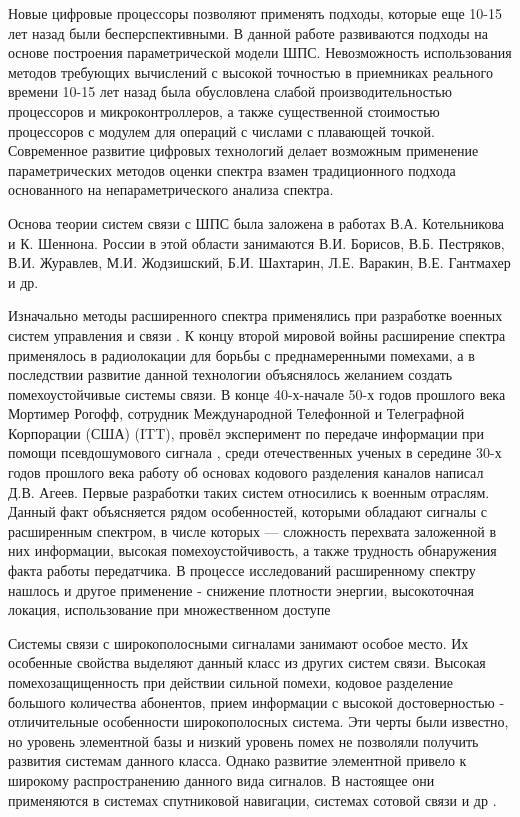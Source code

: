 Новые цифровые процессоры позволяют применять подходы, которые еще 10-15 лет назад были бесперспективными.
В данной работе развиваются подходы на основе построения параметрической модели ШПС. Невозможность использования
методов требующих вычислений с высокой точностью в приемниках реального времени
10-15 лет назад была обусловлена слабой производительностью процессоров и микроконтроллеров, а также существенной
стоимостью процессоров с модулем для операций с числами с плавающей точкой. Современное развитие цифровых технологий делает 
возможным применение параметрических методов оценки спектра взамен традиционного подхода основанного на непараметрического
анализа спектра.

Основа теории систем связи с ШПС была заложена в работах В.А. Котельникова и К. Шеннона.
России в этой области занимаются В.И. Борисов, В.Б. Пестряков, В.И. Журавлев, М.И. Жодзишский, Б.И. Шахтарин, Л.Е.  Варакин, В.Е. Гантмахер и др.

Изначально методы расширенного спектра применялись при разработке военных систем управления и связи \cite{sklyar}.
К концу второй мировой войны расширение спектра применялось в радиолокации для борьбы с преднамеренными помехами, а
в последствии развитие данной технологии объяснялось желанием создать помехоустойчивые системы связи.
В конце 40-х-начале 50-х годов прошлого века Мортимер Рогофф, сотрудник Международной Телефонной и Телеграфной Корпорации (США) (ITT),
провёл эксперимент по передаче информации при помощи псевдошумового сигнала \cite{sklyar}, среди отечественных ученых
в середине 30-х годов прошлого века работу об основах кодового разделения каналов написал Д.В. Агеев.
Первые разработки таких систем относились к военным отраслям. Данный факт объясняется рядом особенностей, которыми обладают
сигналы с расширенным спектром, в числе которых — сложность перехвата заложенной в них информации,
высокая помехоустойчивость, а также трудность обнаружения факта работы передатчика. В процессе исследований расширенному спектру
нашлось и другое применение - снижение плотности энергии, высокоточная локация, использование при множественном доступе
\cite{sklyar}

Системы связи с широкополосными сигналами занимают особое место. Их особенные свойства выделяют данный класс из других систем
связи. Высокая помехозащищенность при действии сильной помехи, кодовое разделение большого количества абонентов, прием
информации с высокой достоверностью - отличительные особенности широкополосных система. Эти черты были известно, но
уровень элементной базы и низкий уровень помех не позволяли получить развития системам данного класса. Однако развитие
элементной привело к широкому распространению данного вида сигналов. В настоящее они применяются в системах спутниковой навигации,
системах сотовой связи и др \cite{varakin-book}.

